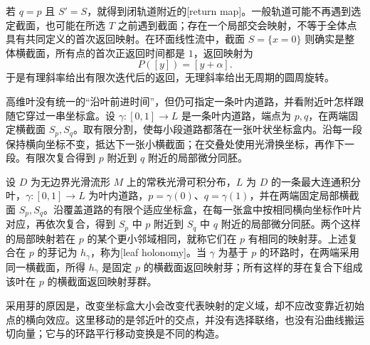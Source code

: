 若 \(q=p\) 且 \(S'=S\)，就得到闭轨道附近的[return map]。一般轨道可能不再遇到选定截面，也可能在所选 \(T\) 之前遇到截面；存在一个局部交会映射，不等于全体点具有共同定义的首次返回映射。在环面线性流中，截面 \(S=\{x=0\}\) 则确实是整体横截面，所有点的首次正返回时间都是 \(1\)，返回映射为
\[
	P([y])=[y+\alpha].
\]
于是有理斜率给出有限次迭代后的返回，无理斜率给出无周期的圆周旋转。

\ProseParagraphBreak

高维叶没有统一的“沿叶前进时间”，但仍可指定一条叶内道路，并看附近叶怎样跟随它穿过一串坐标盒。设 \(\gamma:[0,1]\to L\) 是一条叶内道路，端点为 \(p,q\)，在两端固定横截面 \(S_p,S_q\)。取有限分割，使每小段道路都落在一张叶状坐标盒内。沿每一段保持横向坐标不变，抵达下一张小横截面；在交叠处使用光滑换坐标，再作下一段。有限次复合得到 \(p\) 附近到 \(q\) 附近的局部微分同胚。

\begin{definition}
	\label{g1:def:leaf-holonomy}
	设 \(D\) 为无边界光滑流形 \(M\) 上的常秩光滑可积分布，\(L\) 为 \(D\) 的一条最大连通积分叶，\(\gamma:[0,1]\to L\) 为叶内道路，\(p=\gamma(0)\)、\(q=\gamma(1)\)，并在两端固定局部横截面 \(S_p,S_q\)。沿覆盖道路的有限个适应坐标盒，在每一张盒中按相同横向坐标作叶片对应，再依次复合，得到 \(S_p\) 中 \(p\) 附近到 \(S_q\) 中 \(q\) 附近的局部微分同胚。两个这样的局部映射若在 \(p\) 的某个更小邻域相同，就称它们在 \(p\) 有相同的映射芽。上述复合在 \(p\) 的芽记为 \(h_\gamma\)，称为[leaf holonomy]。当 \(\gamma\) 为基于 \(p\) 的环路时，在两端采用同一横截面，所得 \(h_\gamma\) 是固定 \(p\) 的横截面返回映射芽；所有这样的芽在复合下组成该叶在 \(p\) 的横截面返回映射芽群。
\end{definition}

采用芽的原因是，改变坐标盒大小会改变代表映射的定义域，却不应改变靠近初始点的横向效应。这里移动的是邻近叶的交点，并没有选择联络，也没有沿曲线搬运切向量；它与的环路平行移动变换是不同的构造。

